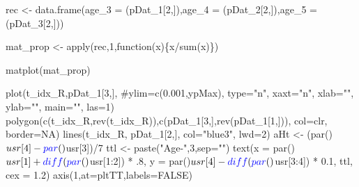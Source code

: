 \documentclass[11pt,]{article}
\newenvironment{Shaded}{}{}
\newcommand{\KeywordTok}[1]{\textcolor[rgb]{0.00,0.00,1.00}{#1}}
\newcommand{\DataTypeTok}[1]{#1}
\newcommand{\DecValTok}[1]{#1}
\newcommand{\FloatTok}[1]{#1}
\newcommand{\StringTok}[1]{\textcolor[rgb]{0.00,0.50,0.50}{#1}}
\newcommand{\CommentTok}[1]{\textcolor[rgb]{0.00,0.50,0.00}{#1}}
\newcommand{\OtherTok}[1]{\textcolor[rgb]{1.00,0.25,0.00}{#1}}
\newcommand{\ControlFlowTok}[1]{\textcolor[rgb]{0.00,0.00,1.00}{#1}}
\newcommand{\OperatorTok}[1]{#1}
\newcommand{\NormalTok}[1]{#1}
\begin{document}
\begin{Shaded}
\begin{Highlighting}[]
\NormalTok{rec <-}\StringTok{ }\KeywordTok{data.frame}\NormalTok{(}\DataTypeTok{age_3 =}\NormalTok{ (pDat_}\DecValTok{1}\NormalTok{[}\DecValTok{2}\NormalTok{,]),}\DataTypeTok{age_4 =}\NormalTok{ (pDat_}\DecValTok{2}\NormalTok{[}\DecValTok{2}\NormalTok{,]),}\DataTypeTok{age_5 =}\NormalTok{ (pDat_}\DecValTok{3}\NormalTok{[}\DecValTok{2}\NormalTok{,]))}


\NormalTok{mat_prop <-}\StringTok{ }\KeywordTok{apply}\NormalTok{(rec,}\DecValTok{1}\NormalTok{,}\ControlFlowTok{function}\NormalTok{(x)\{x}\OperatorTok{/}\KeywordTok{sum}\NormalTok{(x)\})}

\KeywordTok{matplot}\NormalTok{(mat_prop)}

    \KeywordTok{plot}\NormalTok{(t_idx_R,pDat_}\DecValTok{1}\NormalTok{[}\DecValTok{3}\NormalTok{,], }\CommentTok{#ylim=c(0.001,ypMax),}
         \DataTypeTok{type=}\StringTok{"n"}\NormalTok{, }\DataTypeTok{xaxt=}\StringTok{"n"}\NormalTok{, }\DataTypeTok{xlab=}\StringTok{""}\NormalTok{, }\DataTypeTok{ylab=}\StringTok{""}\NormalTok{, }\DataTypeTok{main=}\StringTok{""}\NormalTok{, }\DataTypeTok{las=}\DecValTok{1}\NormalTok{)}
    \KeywordTok{polygon}\NormalTok{(}\KeywordTok{c}\NormalTok{(t_idx_R,}\KeywordTok{rev}\NormalTok{(t_idx_R)),}\KeywordTok{c}\NormalTok{(pDat_}\DecValTok{1}\NormalTok{[}\DecValTok{3}\NormalTok{,],}\KeywordTok{rev}\NormalTok{(pDat_}\DecValTok{1}\NormalTok{[}\DecValTok{1}\NormalTok{,])), }\DataTypeTok{col=}\NormalTok{clr, }\DataTypeTok{border=}\OtherTok{NA}\NormalTok{)}
    \KeywordTok{lines}\NormalTok{(t_idx_R, pDat_}\DecValTok{1}\NormalTok{[}\DecValTok{2}\NormalTok{,], }\DataTypeTok{col=}\StringTok{"blue3"}\NormalTok{, }\DataTypeTok{lwd=}\DecValTok{2}\NormalTok{)}
\NormalTok{    aHt <-}\StringTok{ }\NormalTok{(}\KeywordTok{par}\NormalTok{()}\OperatorTok{$}\NormalTok{usr[}\DecValTok{4}\NormalTok{]}\OperatorTok{-}\KeywordTok{par}\NormalTok{()}\OperatorTok{$}\NormalTok{usr[}\DecValTok{3}\NormalTok{])}\OperatorTok{/}\DecValTok{7}
\NormalTok{    ttl <-}\StringTok{ }\KeywordTok{paste}\NormalTok{(}\StringTok{"Age-"}\NormalTok{,}\DecValTok{3}\NormalTok{,}\DataTypeTok{sep=}\StringTok{""}\NormalTok{)}
    \KeywordTok{text}\NormalTok{(}\DataTypeTok{x =} \KeywordTok{par}\NormalTok{()}\OperatorTok{$}\NormalTok{usr[}\DecValTok{1}\NormalTok{] }\OperatorTok{+}\StringTok{ }\KeywordTok{diff}\NormalTok{(}\KeywordTok{par}\NormalTok{()}\OperatorTok{$}\NormalTok{usr[}\DecValTok{1}\OperatorTok{:}\DecValTok{2}\NormalTok{]) }\OperatorTok{*}\StringTok{ }\NormalTok{.}\DecValTok{8}\NormalTok{,}
       \DataTypeTok{y =} \KeywordTok{par}\NormalTok{()}\OperatorTok{$}\NormalTok{usr[}\DecValTok{4}\NormalTok{] }\OperatorTok{-}\StringTok{ }\KeywordTok{diff}\NormalTok{(}\KeywordTok{par}\NormalTok{()}\OperatorTok{$}\NormalTok{usr[}\DecValTok{3}\OperatorTok{:}\DecValTok{4}\NormalTok{]) }\OperatorTok{*}\StringTok{ }\FloatTok{0.1}\NormalTok{,}
\NormalTok{       ttl,}
       \DataTypeTok{cex =} \FloatTok{1.2}\NormalTok{)}
    \KeywordTok{axis}\NormalTok{(}\DecValTok{1}\NormalTok{,}\DataTypeTok{at=}\NormalTok{pltTT,}\DataTypeTok{labels=}\OtherTok{FALSE}\NormalTok{)}
    

\end{Highlighting}
\end{Shaded}
\end{document}
